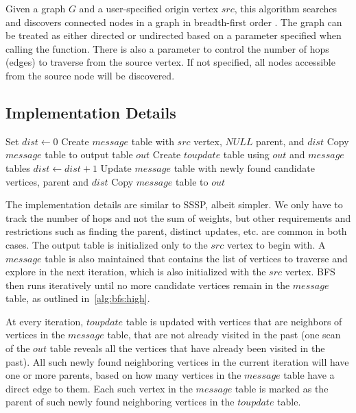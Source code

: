Given a graph $G$ and a user-specified origin vertex $src$, this algorithm
searches and discovers connected nodes in a graph in breadth-first order
\cite{bfs_wikipedia}. The graph can be treated as either directed or
undirected based on a parameter specified when calling the function.
There is also a parameter to control the number of hops (edges) to traverse
from the source vertex. If not specified, all nodes accessible from the
source node will be discovered.

\subsection{Implementation Details}
\begin{algorithm} \label{alg:bfs:high}
\begin{algorithmic}[1]
    \State Set $dist \leftarrow 0$
    \State Create $message$ table with $src$ vertex, $NULL$ parent, and $dist$
    \State Copy $message$ table to output table $out$
    \Repeat
        \State Create $toupdate$ table using $out$ and $message$ tables
        \State $dist \leftarrow dist + 1$
        \State Update $message$ table with newly found candidate vertices, parent and $dist$
        \State Copy $message$ table to $out$
\end{algorithmic}
\end{algorithm}

The implementation details are similar to SSSP, albeit simpler. We only have to
track the number of hops and not the sum of weights, but other requirements and
restrictions such as finding the parent, distinct updates, etc. are common in
both cases. The output table is initialized only to the $src$ vertex to begin
with. A $message$ table is also maintained that contains the list of vertices
to traverse and explore in the next iteration, which is also initialized with
the $src$ vertex. BFS then runs iteratively until no more candidate vertices
remain in the $message$ table, as outlined in~\ref{alg:bfs:high}.

At every iteration, $toupdate$ table is updated with vertices that are neighbors
of vertices in the $message$ table, that are not already visited in the past
(one scan of the $out$ table reveals all the vertices that have already been
visited in the past). All such newly found neighboring vertices in the current
iteration will have one or more parents, based on how many vertices in the
$message$ table have a direct edge to them. Each such vertex in the $message$
table is marked as the parent of such newly found neighboring vertices in
the $toupdate$ table.

